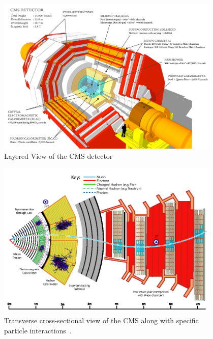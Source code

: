 \begin{figure}
 \begin{center}
  \captionsetup{justification=centering}
  \includegraphics[width=0.95\textwidth,keepaspectratio]{plots_and_figures/chapter3/cms_layered.png}
\caption{Layered View of the CMS detector}
\label{fig:cms_layered}
\end{center}
\end{figure}



\begin{figure}
\begin{center}
  \captionsetup{width=.92\textwidth,justification=centering}
  \includegraphics[width=0.95\textwidth,keepaspectratio]{plots_and_figures/chapter3/cms_cross_sec.png}
\caption{Transverse cross-sectional view of the CMS along with specific particle interactions~\cite{Sirunyan:2017ulk}.}
\label{fig:cms_cross_sec}
\end{center}
\end{figure}




